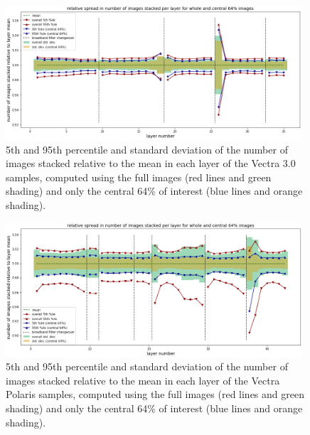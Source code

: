\documentclass[letterpaper,11pt]{article}
\begin{document}
\begin{figure}[!ht]
\centering
\includegraphics[width=0.98\textwidth]{images/measuring_flatfield_corrections/mask_stack_variation_reduction_vectra}
\caption{\footnotesize 5th and 95th percentile and standard deviation of the number of images stacked relative to the mean in each layer of the Vectra 3.0 samples, computed using the full images (red lines and green shading) and only the central 64\% of interest (blue lines and orange shading).}
\label{fig:removing_image_edges_effect_on_mask_stacks_vectra}
\end{figure} 

\begin{figure}[!ht]
\centering
\includegraphics[width=0.98\textwidth]{images/measuring_flatfield_corrections/mask_stack_variation_reduction_polaris}
\caption{\footnotesize 5th and 95th percentile and standard deviation of the number of images stacked relative to the mean in each layer of the Vectra Polaris samples, computed using the full images (red lines and green shading) and only the central 64\% of interest (blue lines and orange shading).}
\label{fig:removing_image_edges_effect_on_mask_stacks_polaris}
\end{figure} 

\clearpage

\end{document}
